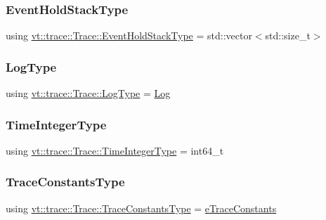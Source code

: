 \subsubsection{\texorpdfstring{Event\+Hold\+Stack\+Type}{EventHoldStackType}}
{\footnotesize\ttfamily using \hyperlink{structvt_1_1trace_1_1_trace_a727542f4171681f2ef03df2c3abce04c}{vt\+::trace\+::\+Trace\+::\+Event\+Hold\+Stack\+Type} =  std\+::vector$<$std\+::size\+\_\+t$>$}

\mbox{\label{structvt_1_1trace_1_1_trace_a43306d96a91e49db081eaea016f1dd0a}} 
\subsubsection{\texorpdfstring{Log\+Type}{LogType}}
{\footnotesize\ttfamily using \hyperlink{structvt_1_1trace_1_1_trace_a43306d96a91e49db081eaea016f1dd0a}{vt\+::trace\+::\+Trace\+::\+Log\+Type} =  \hyperlink{structvt_1_1trace_1_1_log}{Log}}

\mbox{\label{structvt_1_1trace_1_1_trace_ab8db9218a8ab87f59773fcbf81433787}} 
\subsubsection{\texorpdfstring{Time\+Integer\+Type}{TimeIntegerType}}
{\footnotesize\ttfamily using \hyperlink{structvt_1_1trace_1_1_trace_ab8db9218a8ab87f59773fcbf81433787}{vt\+::trace\+::\+Trace\+::\+Time\+Integer\+Type} =  int64\+\_\+t}

\mbox{\label{structvt_1_1trace_1_1_trace_accb35b20499dfdd46e6c79daae9fc265}} 
\subsubsection{\texorpdfstring{Trace\+Constants\+Type}{TraceConstantsType}}
{\footnotesize\ttfamily using \hyperlink{namespacevt_1_1trace_acf454dfbd581b0ebae895f90b5927a1d}{vt\+::trace\+::\+Trace\+::\+Trace\+Constants\+Type} =  \hyperlink{namespacevt_1_1trace_acf454dfbd581b0ebae895f90b5927a1d}{e\+Trace\+Constants}}

